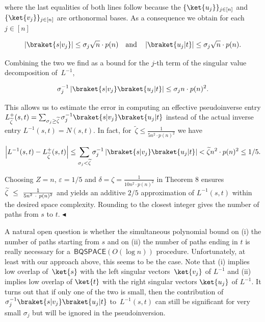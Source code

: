 where the last equalities of both lines follow because the $\{\ket{u_{j}}\}_{j\in[n]}$ and $\{\ket{v_{j}}\}_{j\in[n]}$ are orthonormal bases.
As a consequence we obtain for each $j\in[n]$\par


\[\begin{gathered}
\displaystyle\left|\braket{s|v_{j}}\right|\leq\sigma_{j}\sqrt{n}\cdot p(n)\quad\text{and}\quad\left|\braket{u_{j}|t}\right|\leq\sigma_{j}\sqrt{n}\cdot p(n).
\end{gathered}\]


Combining the two we find as a bound for the $j$-th term of the singular value decomposition of $L^{-1}$,\par


\[\begin{gathered}
\displaystyle\sigma_{j}^{-1}\left|\braket{s|v_{j}}\braket{u_{j}|t}\right|\leq\sigma_{j}n\cdot p(n)^{2}.
\end{gathered}\]


This allows us to estimate the error in computing an effective pseudoinverse entry $L_{\widetilde{\zeta}}^{+}(s,t)=\sum_{\sigma_{j}\geq\widetilde{\zeta}}\sigma_{j}^{-1}\braket{s|v_{j}}\braket{u_{j}|t}$ instead of the actual inverse entry $L^{-1}(s,t)=N(s,t)$.
In fact, for $\widetilde{\zeta}\leq\frac{1}{5n^{2}\cdot p(n)^{2}}$ we have\par


\[\begin{gathered}
\displaystyle\left|L^{-1}(s,t)-L_{\widetilde{\zeta}}^{+}(s,t)\right|\leq\sum_{\sigma_{j}<\widetilde{\zeta}}\sigma_{j}^{-1}\left|\braket{s|v_{j}}\braket{u_{j}|t}\right|<\widetilde{\zeta}n^{2}\cdot p(n)^{2}\leq 1/5.
\end{gathered}\]


Choosing $Z=n$, $\varepsilon=1/5$ and $\delta=\zeta=\frac{1}{10n^{2}\cdot p(n)^{2}}$ in Theorem 8 ensures $\widetilde{\zeta}\nobreak\ \leq\nobreak\ \frac{1}{5n^{2}\nobreak\ \cdot\nobreak\ p(n)^{2}}$ and yields an additive $2/5$ approximation of $L^{-1}(s,t)$ within the desired space complexity.
Rounding to the closest integer gives the number of paths from $s$ to $t$.
$\blacktriangleleft$\par




A natural open question is whether the simultaneous polynomial bound on (i) the number of paths starting from $s$ and on (ii) the number of paths ending in $t$ is really necessary for a $\mathsf{BQSPACE}(O(\log n))$ procedure.
Unfortunately, at least with our approach above, this seems to be the case.
Note that (i) implies low overlap of $\ket{s}$ with the left singular vectors $\ket{v_{j}}$ of $L^{-1}$ and (ii) implies low overlap of $\ket{t}$ with the right singular vectors $\ket{u_{j}}$ of $L^{-1}$.
It turns out that if only one of the two is small, then the contribution of $\sigma_{j}^{-1}\braket{s|v_{j}}\braket{u_{j}|t}$ to $L^{-1}(s,t)$ can still be significant for very small $\sigma_{j}$ but will be ignored in the pseudoinversion.\par







